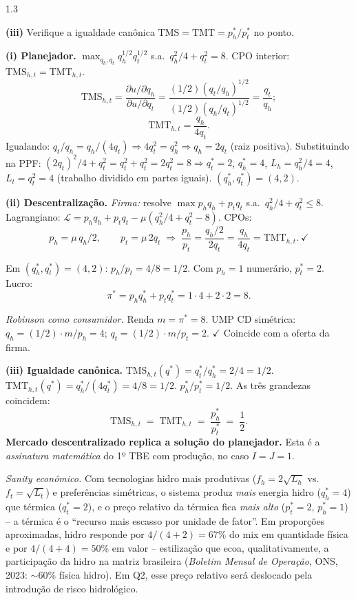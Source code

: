 \documentclass[11pt,addpoints]{exam}
\newcommand{\TMS}{\text{TMS}}
\newcommand{\TMT}{\text{TMT}}
\begin{document}
\begin{spacing}{1.3}
\begin{questions}
\begin{parts}
\textbf{(iii)} Verifique a igualdade canônica $\TMS = \TMT = p_h^*/p_t^*$ no ponto.

\begin{solution}
\textbf{(i) Planejador.} $\max_{q_h, q_t} q_h^{1/2}q_t^{1/2}$ s.a.\ $q_h^2/4 + q_t^2 = 8$. CPO interior: $\TMS_{h,t} = \TMT_{h,t}$.
\[
    \TMS_{h,t} = \frac{\partial u/\partial q_h}{\partial u/\partial q_t} = \frac{(1/2)(q_t/q_h)^{1/2}}{(1/2)(q_h/q_t)^{1/2}} = \frac{q_t}{q_h};
\]
\[
    \TMT_{h,t} = \frac{q_h}{4 q_t}.
\]
Igualando: $q_t/q_h = q_h/(4 q_t) \Rightarrow 4 q_t^2 = q_h^2 \Rightarrow q_h = 2 q_t$ (raiz positiva). Substituindo na PPF: $(2 q_t)^2/4 + q_t^2 = q_t^2 + q_t^2 = 2 q_t^2 = 8 \Rightarrow q_t^* = 2$, $q_h^* = 4$, $L_h = q_h^2/4 = 4$, $L_t = q_t^2 = 4$ (trabalho dividido em partes iguais). $\boxed{(q_h^*, q_t^*) = (4, 2)}$.

\textbf{(ii) Descentralização.} \emph{Firma:} resolve $\max p_h q_h + p_t q_t$ s.a.\ $q_h^2/4 + q_t^2 \leq 8$. Lagrangiano: $\mathcal{L} = p_h q_h + p_t q_t - \mu (q_h^2/4 + q_t^2 - 8)$. CPOs:
\[
    p_h = \mu\, q_h/2,\qquad p_t = \mu\, 2 q_t \;\Longrightarrow\; \frac{p_h}{p_t} = \frac{q_h/2}{2 q_t} = \frac{q_h}{4 q_t} = \TMT_{h,t}.\ \checkmark
\]

Em $(q_h^*, q_t^*) = (4, 2)$: $p_h/p_t = 4/8 = 1/2$. Com $p_h = 1$ numerário, $\boxed{p_t^* = 2}$. Lucro:
\[
    \pi^* = p_h q_h^* + p_t q_t^* = 1\cdot 4 + 2\cdot 2 = 8.
\]

\emph{Robinson como consumidor.} Renda $m = \pi^* = 8$. UMP CD simétrica: $q_h = (1/2)\cdot m/p_h = 4$; $q_t = (1/2)\cdot m/p_t = 2$. $\checkmark$ Coincide com a oferta da firma.

\textbf{(iii) Igualdade canônica.} $\TMS_{h,t}(q^*) = q_t^*/q_h^* = 2/4 = 1/2$. $\TMT_{h,t}(q^*) = q_h^*/(4 q_t^*) = 4/8 = 1/2$. $p_h^*/p_t^* = 1/2$. As três grandezas coincidem:
\[
    \boxed{\;\TMS_{h,t} \;=\; \TMT_{h,t} \;=\; \frac{p_h^*}{p_t^*} \;=\; \frac{1}{2}.\;}
\]
\textbf{Mercado descentralizado replica a solução do planejador.} Esta é a \emph{assinatura matemática} do 1º TBE com produção, no caso $I = J = 1$.

\textit{Sanity econômico.} Com tecnologias hidro mais produtivas ($f_h = 2\sqrt{L_h}$ vs.\ $f_t = \sqrt{L_t}$) e preferências simétricas, o sistema produz \emph{mais} energia hidro ($q_h^* = 4$) que térmica ($q_t^* = 2$), e o preço relativo da térmica fica \emph{mais alto} ($p_t^* = 2$, $p_h^* = 1$) -- a térmica é o ``recurso mais escasso por unidade de fator''. Em proporções aproximadas, hidro responde por $4/(4+2) = 67\%$ do mix em quantidade física e por $4/(4+4) = 50\%$ em valor -- estilização que ecoa, qualitativamente, a participação da hidro na matriz brasileira (\emph{Boletim Mensal de Operação}, ONS, 2023: $\sim$60\% física hidro). Em Q2, esse preço relativo será deslocado pela introdução de risco hidrológico.
\end{solution}


\end{parts}
\end{questions}
\end{spacing}
\end{document}
